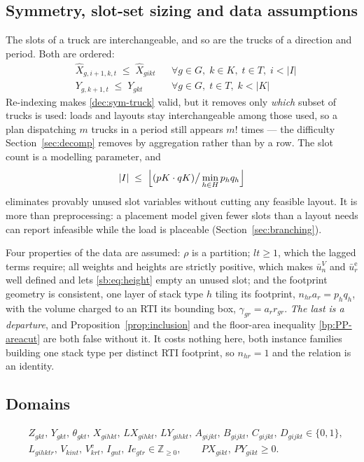 \subsection{Symmetry, slot-set sizing and data assumptions}
\label{sb:sec:symm}

The slots of a truck are interchangeable, and so are the trucks of a
direction and period. Both are ordered:
\begin{align}
  & \widehat{X}_{g,i+1,k,t}\;\le\;\widehat{X}_{gikt}
    && \forall g\in G,\; k\in K,\; t\in T,\; i<|I|
    \label{sb:eq:sym}\\
  & Y_{g,k+1,t}\;\le\;Y_{gkt}
    && \forall g\in G,\; t\in T,\; k<|K|
    \label{dec:sym-truck}
\end{align}
Re-indexing makes \eqref{dec:sym-truck} valid, but it removes only
\emph{which} subset of trucks is used: loads and layouts stay
interchangeable among those used, so a plan dispatching $m$ trucks in a
period still appears $m!$ times --- the difficulty
Section~\ref{sec:decomp} removes by aggregation rather than by a row.
The slot count is a modelling parameter, and
\begin{equation}
|I|\;\le\;\Bigl\lfloor
    (pK\cdot qK)\big/\min_{h\in H} p_{h}q_{h}
\Bigr\rfloor
\label{sb:eq:Ibound}
\end{equation}
eliminates provably unused slot variables without cutting any feasible
layout. It is more than preprocessing: a placement model given fewer
slots than a layout needs can report infeasible while the load is
placeable (Section~\ref{sec:branching}).

Four properties of the data are assumed: $\rho$ is a partition;
$lt\ge1$, which the lagged terms require; all weights and heights are
strictly positive, which makes $\bar u^{V}_{n}$ and
$\bar u^{\mathrm{e}}_{r}$ well defined and lets \eqref{sb:eq:height}
empty an unused slot; and the footprint geometry is consistent, one
layer of stack type $h$ tiling its footprint, $n_{hr}a_{r}=p_{h}q_{h}$,
with the volume charged to an RTI its bounding box,
$\gamma_{gr}=a_{r}r_{gr}$. \emph{The last is a departure}, and
Proposition~\ref{prop:inclusion} and the floor-area inequality
\eqref{bp:PP-areacut} are both false without it. It costs nothing
here, both instance families building one stack type per distinct RTI
footprint, so $n_{hr}=1$ and the relation is an identity.

\subsection{Domains}

\begin{align*}
&Z_{gkt},\,Y_{gkt},\,\theta_{gkt},\,X_{gihkt},\,LX_{gihkt},\,LY_{gihkt},\,
  A_{gijkt},\,B_{gijkt},\,C_{gijkt},\,D_{gijkt}\in\{0,1\},\\
&L_{gihktr},\,V_{kint},\,V^{\mathrm{e}}_{krt},\,I_{gnt},\,Ie_{gtr}
  \in\mathbb{Z}_{\ge 0},\qquad
PX_{gikt},\,PY_{gikt}\ge 0.
\end{align*}
